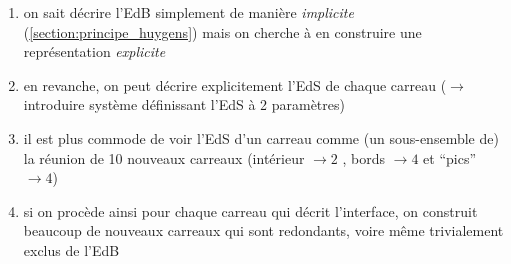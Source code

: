 \begin{enumerate}
	\item on sait décrire l'EdB simplement de manière \textit{implicite} (\cf \autoref{section:principe_huygens}) mais on cherche à en construire une représentation \textit{explicite}
	\item en revanche, on peut décrire explicitement l'EdS de chaque carreau ($\to$ introduire système définissant l'EdS à 2 paramètres)
	\item il est plus commode de voir l'EdS d'un carreau comme (un sous-ensemble de) la réunion de 10 nouveaux carreaux (intérieur $\to 2$ , bords $\to 4$ et ``pics'' $\to 4$)
	\item si on procède ainsi pour chaque carreau qui décrit l'interface, on construit beaucoup de nouveaux carreaux qui sont redondants, voire même trivialement exclus de l'EdB

%	
%	
%	
	

\end{enumerate}
